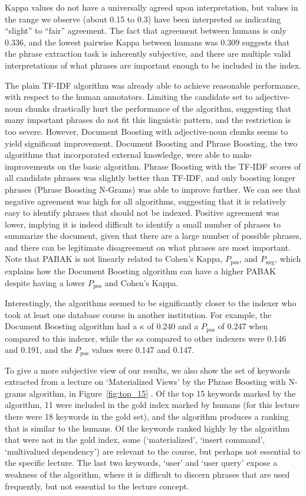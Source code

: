 Kappa values do not have a universally agreed upon interpretation, but
values in the range we observe (about 0.15 to 0.3) have been
interpreted as indicating ``slight'' to ``fair'' agreement. The fact
that agreement between humans is only 0.336, and the lowest pairwise
Kappa between humans was 0.309 suggests that the phrase extraction
task is inherently subjective, and there are multiple valid
interpretations of what phrases are important enough to be included in
the index.

The plain TF-IDF algorithm was already able to achieve reasonable
performance, with respect to the human annotators. Limiting the
candidate set to adjective-noun chunks drastically hurt the
performance of the algorithm, suggesting that many important phrases
do not fit this linguistic pattern, and the restriction is too
severe. However, Document Boosting with adjective-noun chunks seems to
yield significant improvement. Document Boosting and Phrase Boosting, the two algorithms that
incorporated external knowledge, were able to make improvements on the
basic algorithm. Phrase Boosting with the TF-IDF scores of all
candidate phrases was slightly better than TF-IDF, and only boosting
longer phrases (Phrase Boosting N-Grams) was able to improve
further. We can see that negative agreement was high for all
algorithms, suggesting that it is relatively easy to identify phrases
that should not be indexed. Positive agreement was lower, implying it is indeed difficult to identify a small number of phrases to summarize the document, given that there are a large number of possible phrases, and there can be legitimate disagreement on what phrases are most important. Note that PABAK is not linearly related to Cohen's Kappa, $P_{\text{pos}}$, and $P_{\text{neg}}$, which explains how the Document Boosting algorithm can have a higher PABAK despite having a lower $P_{\text{pos}}$ and Cohen's Kappa.

Interestingly, the algorithms seemed to be significantly closer to the
indexer who took at least one database course in another institution.
For example, the Document Boosting algorithm had a $\kappa$ of 0.240 and
a $P_{\text{pos}}$ of 0.247 when compared to this indexer, while the
$\kappa$s compared to other indexers were 0.146 and 0.191, and the
$P_{\text{pos}}$ values were 0.147 and 0.147.

To give a more subjective view of our results, we also show the set of keywords extracted from a lecture on `Materialized Views' by the Phrase Boosting with N-grams algorithm, in Figure~\ref{fig:top_15} . Of the top 15 keywords marked by the algorithm, 11 were included in the gold index marked by humans (for this lecture there were 18 keywords in the gold set), and the algorithm produces a ranking that is similar to the humans. Of the keywords ranked highly by the algorithm that were not in the gold index, some (`materialized', `insert command', `multivalued dependency') are relevant to the course, but perhaps not essential to the specific lecture. The last two keywords, `user' and `user query' expose a weakness of the algorithm, where it is difficult to discern phrases that are used frequently, but not essential to the lecture concept.
